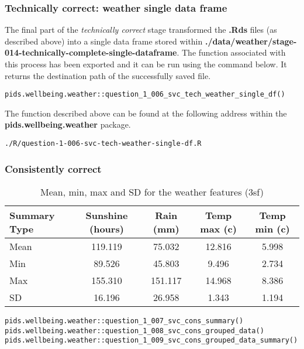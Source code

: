 \documentclass[12pt, oneside, openany]{book}
\begin{document}
\subsubsection*{Technically correct: weather single data frame}

The final part of the \emph{technically correct} stage transformed the \textbf{.Rds} files (as described above) into a single data frame stored within \textbf{./data/weather/stage-014-technically-complete-single-dataframe}. The function associated with this process has been exported and it can be run using the command below. It returns the destination path of the successfully saved file.

\begin{verbatim}
pids.wellbeing.weather::question_1_006_svc_tech_weather_single_df()
\end{verbatim}

The function described above can be found at the following address within the \textbf{pids.wellbeing.weather} package.

\begin{verbatim}
./R/question-1-006-svc-tech-weather-single-df.R
\end{verbatim}

\subsubsection*{Consistently correct}

\begin{table}[h!]
	\centering
	\begin{tabular}{ |l|c|c|c|c| }
		\hline
		Summary Type & Sunshine (hours) & Rain (mm) & Temp max (c) & Temp min (c)\\
		\hline
		\hline
		Mean & 119.119  & 75.032  & 12.816 & 5.998 \\
		Min & 89.526  & 45.803  & 9.496   & 2.734 \\
		Max & 155.310 & 151.117  & 14.968  & 8.386 \\
		SD & 16.196  & 26.958   & 1.343  & 1.194 \\
		\hline
	\end{tabular}
	\caption{Mean, min, max and SD for the weather features (3sf)}
	\label{table:question_1_008_grouped_data_summary_non_scaled}
\end{table}

\begin{verbatim}
pids.wellbeing.weather::question_1_007_svc_cons_summary()
pids.wellbeing.weather::question_1_008_svc_cons_grouped_data()
pids.wellbeing.weather::question_1_009_svc_cons_grouped_data_summary()
\end{verbatim}
\end{document}
